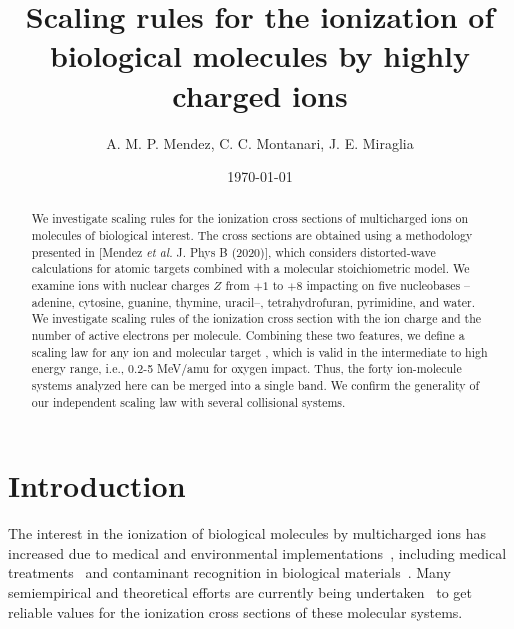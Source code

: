 \documentclass[10pt,showpacs,showkeys,twocolumn]{revtex4-1}
\begin{document}
\title[Scaling rules for the ionization of biological
molecules]{Scaling rules for the ionization of biological
molecules by highly charged ions}
\author{A. M. P. Mendez, C. C. Montanari, J. E. Miraglia}

\date{\today}%

\begin{abstract}
We investigate scaling rules for the ionization cross sections of
multicharged ions on molecules of biological interest. The cross 
sections are obtained using a methodology presented in [Mendez 
\textit{et al.} J. Phys B (2020)], which considers distorted-wave 
calculations for atomic targets combined with a molecular 
stoichiometric model. We examine ions with nuclear charges $Z$ from 
$+1$ to $+8$ impacting on five nucleobases --adenine, cytosine, 
guanine, thymine, uracil--, tetrahydrofuran, pyrimidine, and water. 
We investigate %
scaling rules of the ionization cross section with 
the ion charge and the number of active electrons per molecule. 
Combining these two features, we define a scaling law  for any ion and molecular target %
, which is 
valid in the intermediate to high energy range, i.e., 0.2-5 MeV/amu for oxygen impact. %
Thus, the forty 
ion-molecule systems analyzed here can be merged into a single band. 
We confirm the generality of our independent scaling law with several
collisional systems. 
\end{abstract}


\maketitle
\linenumbers

\section{Introduction}

The interest in the ionization of biological molecules by 
multicharged ions has increased due to medical and environmental
implementations~\cite{PhysMed}, including medical 
treatments~\cite{Mohamad2017,Solov2009,Denifl2011} and contaminant 
recognition in biological materials~\cite{water,ferrazdias}. 
Many semiempirical \citep{vera_prl2013} and theoretical efforts are 
currently being undertaken~\cite{MendezJPB20,Quinto20,ludde2019,
ludde2018,ludde2016,Champion2012} to get reliable values for the 
ionization cross sections of these molecular systems. 
\end{document}
